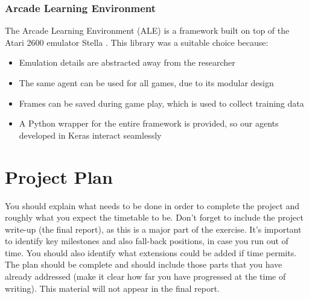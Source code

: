 \documentclass[12pt,twoside]{article}
\begin{document}
\subsubsection{Arcade Learning Environment}
The Arcade Learning Environment (ALE) is a framework built on top of the Atari 2600 emulator Stella \cite{Bellemare2015}. This library was a suitable choice because:
\begin{itemize}
\item Emulation details are abstracted away from the researcher
\item The same agent can be used for all games, due to its modular design
\item Frames can be saved during game play, which is used to collect training data
\item A Python wrapper for the entire framework is provided, so our agents developed in Keras interact seamlessly
\end{itemize}

\newpage
\section{Project Plan}
You should explain what needs to be done in order to complete the project and roughly what you expect the timetable to be. Don’t forget to include the project write-up (the final report), as this is a major part of the exercise. It’s important to identify key milestones and also fall-back positions, in case you run out of time.  You should also identify what extensions could be added if time permits.  The plan should be complete and should include those parts that you have already addressed (make it clear how far you have progressed at the time of writing).  This material will not appear in the final report.
\end{document}
